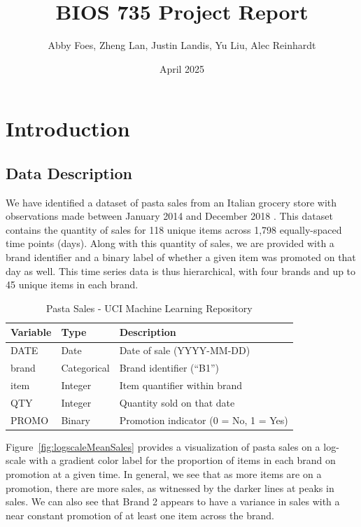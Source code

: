 \documentclass{article}
\title{BIOS 735 Project Report}
\author{Abby Foes, Zheng Lan, Justin Landis, Yu Liu, Alec Reinhardt}
\date{April 2025}
\begin{document}
\maketitle

\section{Introduction}

\subsection*{Data Description}

\noindent We have identified a dataset of pasta sales from an Italian grocery store with observations made between January 2014 and December 2018 \citep{mancuso2021}. This dataset contains the quantity of sales for 118 unique items across 1,798 equally-spaced time points (days). Along with this quantity of sales, we are provided with a brand identifier and a binary label of whether a given item was promoted on that day as well. This time series data is thus hierarchical, with four brands and up to 45 unique items in each brand.

\begin{table}[ht]
\centering
\begin{tabular}{lll}
\toprule
\textbf{Variable} & \textbf{Type} & \textbf{Description} \\
\midrule
DATE   & Date         & Date of sale (YYYY-MM-DD)               \\
brand  & Categorical   & Brand identifier (``B1'')              \\
item   & Integer       & Item quantifier within brand           \\
QTY    & Integer       & Quantity sold on that date             \\
PROMO  & Binary        & Promotion indicator (0 = No, 1 = Yes)  \\
\hline
\end{tabular}
\caption{Pasta Sales - UCI Machine Learning Repository}
\label{tab:eda-table}
\end{table}


\noindent Figure~\ref{fig:logscaleMeanSales} provides a visualization of pasta sales on a log-scale with a gradient color label for the proportion of items in each brand on promotion at a given time. In general, we see that as more items are on a promotion, there are more sales, as witnessed by the darker lines at peaks in sales. We can also see that Brand 2 appears to have a variance in sales with a near constant promotion of at least one item across the brand. 
\end{document}
